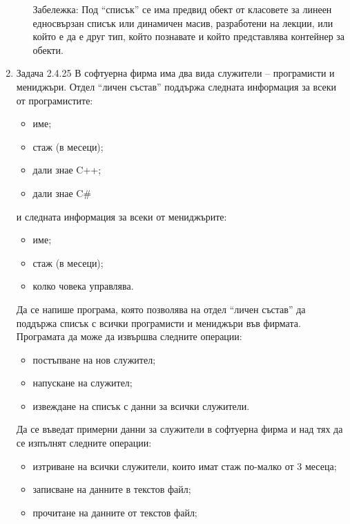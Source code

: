 \begin{enumerate}
\begin{enumerate}[label=\alph*)]
\begin{flushleft}
      Забележка: Под ``списък'' се има предвид обект от класовете за линеен едносвързан списък или динамичен масив, разработени на лекции, или който е да е друг тип, който познавате и който представлява контейнер за обекти.

      \end{flushleft}

    \end{enumerate}

    \item Задача 2.4.25\cite{sbornik2} В софтуерна фирма има два вида служители – програмисти и мениджъри. Отдел ``личен състав'' поддържа следната информация за всеки от програмистите:
    \begin{itemize}
      \item име;
      \item стаж (в месеци);
      \item дали знае C++;
      \item дали знае C\#
    \end{itemize}
    и следната информация за всеки от мениджърите:
    \begin{itemize}
      \item име;
      \item стаж (в месеци);
      \item колко човека управлява.
    \end{itemize}

    Да се напише програма, която позволява на отдел ``личен състав'' да поддържа списък с всички програмисти и мениджъри във фирмата. Програмата да може да извършва следните операции:
    \begin{itemize}
      \item постъпване на нов служител;
      \item напускане на служител;
      \item извеждане на списък с данни за всички служители.
    \end{itemize}

    Да се въведат примерни данни за служители  в софтуерна фирма и над тях да се изпълнят следните операции:

    \begin{itemize}
      \item изтриване на всички служители, които имат стаж по-малко от 3 месеца;
      \item записване на данните в текстов файл;
      \item прочитане на данните от текстов файл;
    \end{itemize}

\end{enumerate}

